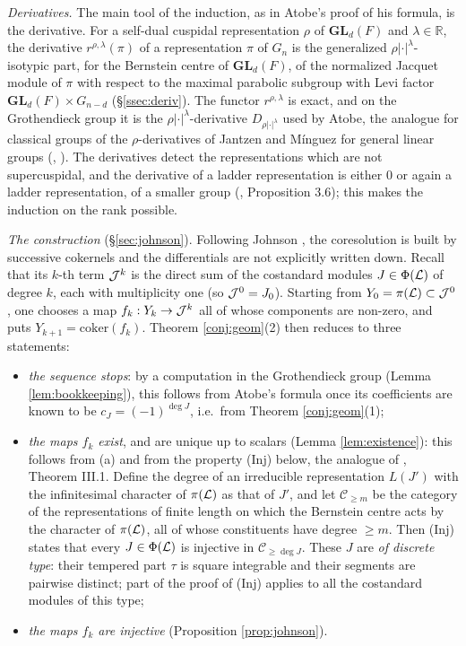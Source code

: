 \documentclass[a4paper,12pt,leqno]{amsart}
\theoremstyle{plain}
\theoremstyle{definition}
\begin{document}
\emph{Derivatives.} The main tool of the induction, as in Atobe's proof of his formula, is the
derivative. For a self-dual cuspidal representation $\rho$ of $\mathbf{GL}_d(F)$ and $\lambda\in\mathbb
R$, the derivative $r^{\rho,\lambda}(\pi)$ of a representation $\pi$ of $G_n$ is the generalized
$\rho|\cdot|^\lambda$-isotypic part, for the Bernstein centre of $\mathbf{GL}_d(F)$, of the normalized
Jacquet module of $\pi$ with respect to the maximal parabolic subgroup with Levi factor
$\mathbf{GL}_d(F)\times G_{n-d}$ (\S\ref{ssec:deriv}). The functor $r^{\rho,\lambda}$ is exact, and on
the Grothendieck group it is the $\rho|\cdot|^\lambda$-derivative $D_{\rho|\cdot|^\lambda}$ used by Atobe,
the analogue for classical groups of the $\rho$-derivatives of Jantzen and M\'inguez for general linear
groups (\cite{Jan07}, \cite{AM23}). The derivatives detect the representations which are not
supercuspidal, and the derivative of a ladder representation is either $0$ or again a ladder
representation, of a smaller group (\cite{Ato24}, Proposition 3.6); this makes the induction on the
rank possible.

\emph{The construction} (\S\ref{sec:johnson}). Following Johnson \cite{Joh84}, the coresolution is built by successive cokernels
and the  differentials are not explicitly  written down. Recall that its $k$-th term
$\mathcal{J}^k$ is the direct sum of the costandard modules $J\in\Phi(\mathcal{L})$ of degree $k$, each with multiplicity
one (so $\mathcal{J}^0=J_0$). Starting from $Y_0=\pi(\mathcal{L})\subset\mathcal{J}^0$, one chooses a map
$f_k:Y_k\to\mathcal{J}^k$ all of whose components are non-zero, and puts $Y_{k+1}=\mathrm{coker}(f_k)$. Theorem
\ref{conj:geom}(2) then reduces to three statements:
\begin{itemize}
\item[(a)] \emph{the sequence stops}: by a computation in the Grothendieck group
(Lemma \ref{lem:bookkeeping}), this follows from Atobe's formula once its coefficients are known to be
$c_J=(-1)^{\deg J}$, i.e.\ from Theorem \ref{conj:geom}(1);
\item[(b)] \emph{the maps $f_k$ exist}, and are unique up to scalars (Lemma \ref{lem:existence}): this
follows from (a) and from the property (Inj) below, the analogue of \cite{Joh84}, Theorem III.1. Define the
degree of an irreducible representation $L(J')$ with the infinitesimal character of $\pi(\mathcal{L})$ as that
of $J'$, and let $\mathcal C_{\geq m}$ be the category of the representations of finite length on which
the Bernstein centre acts by the character of $\pi(\mathcal{L})$, all of whose constituents have degree
$\geq m$. Then (Inj) states that every $J\in\Phi(\mathcal{L})$ is injective in $\mathcal C_{\geq\deg J}$. These
$J$ are \emph{of discrete type}: their tempered part $\tau$ is square integrable and their segments are
pairwise distinct; part of the proof of (Inj) applies to all the costandard modules of this type;
\item[(c)] \emph{the maps $f_k$ are injective} (Proposition \ref{prop:johnson}).
\end{itemize}
\end{document}
